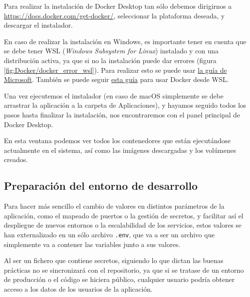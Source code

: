 
Para realizar la instalación de Docker Desktop tan sólo debemos dirigirnos a \url{https://docs.docker.com/get-docker/}, seleccionar la plataforma deseada, y descargar el instalador.


En caso de realizar la instalación en Windows, es importante tener en cuenta que se debe tener WSL (\textit{Windows Subsystem for Linux}) instalado y con una distribución activa, ya que si no la instalación puede dar errores (figura \ref{fig:Docker/docker_error_wsl}). Para realizar esto se puede usar \href{https://learn.microsoft.com/es-es/windows/wsl/install}{la guía de Microsoft}. También se puede seguir \href{https://learn.microsoft.com/es-es/windows/wsl/tutorials/wsl-containers}{esta guía} para usar Docker desde WSL.


Una vez ejecutemos el instalador (en caso de macOS simplemente se debe arrastrar la aplicación a la carpeta de Aplicaciones), y hayamos seguido todos los pasos hasta finalizar la instalación, nos encontraremos con el panel principal de Docker Desktop. 


En esta ventana podemos ver todos los contenedores que están ejecutándose actualmente en el sistema, así como las imágenes descargadas y los volúmenes creados.

\subsection{Preparación del entorno de desarrollo} \label{entorno-desarrollo}

Para hacer más sencillo el cambio de valores en distintos parámetros de la aplicación, como el mapeado de puertos o la gestión de secretos, y facilitar así el despliegue de nuevos entornos o la escalabilidad de los servicios, estos valores se han externalizado en un sólo archivo \verb,.env,, que va a ser un archivo que simplemente va a contener las variables junto a sus valores. 

Al ser un fichero que contiene secretos, siguiendo lo que dictan las buenas prácticas no se sincronizará con el repositorio, ya que si se tratase de un entorno de producción o el código se hiciera público, cualquier usuario podría obtener acceso a los datos de los usuarios de la aplicación.

